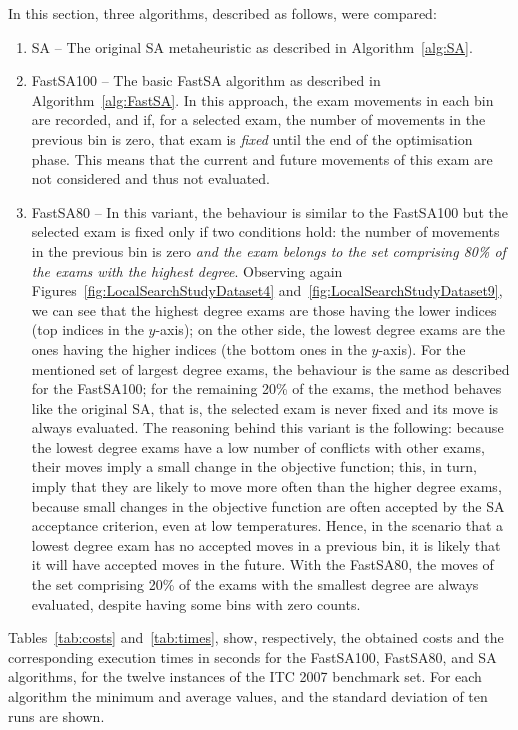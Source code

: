 In this section, three algorithms, described as follows, were compared: 
\begin{enumerate}
	\item SA -- The original SA metaheuristic as described in Algorithm~\ref{alg:SA}.
	
	\item FastSA100 -- The basic FastSA algorithm as described in Algorithm~\ref{alg:FastSA}. In this approach, the exam movements in each bin are recorded, and if, for a selected exam, the number of movements in the previous bin is zero, that exam is \textit{fixed} until the end of the optimisation phase. This means that the current and future movements of this exam are not considered and thus not evaluated.
	
	\item FastSA80 -- In this variant, the behaviour is similar to the FastSA100 but the selected exam is fixed only if two conditions hold: the number of movements in the previous bin is zero \textit{and the exam belongs to the set comprising 80\% of the exams with the highest degree}. Observing again Figures~\ref{fig:LocalSearchStudyDataset4} and~\ref{fig:LocalSearchStudyDataset9}, we can see that the highest degree exams are those having the lower indices (top indices in the $y$-axis); on the other side, the lowest degree exams are the ones having the higher indices (the bottom ones in the $y$-axis). For the mentioned set of largest degree exams, the behaviour is the same as described for the FastSA100; for the remaining 20\% of the exams, the method behaves like the original SA, that is, the selected exam is never fixed and its move is always evaluated. The reasoning behind this variant is the following: because the lowest degree exams have a low number of conflicts with other exams, their moves imply a small change in the objective function; this, in turn, imply that they are likely to move more often than the higher degree exams, because small changes in the objective function are often accepted by the SA acceptance criterion, even at low temperatures. Hence, in the scenario that a lowest degree exam has no accepted moves in a previous bin, it is likely that it will have accepted moves in the future. With the FastSA80, the moves of the set comprising 20\% of the exams with the smallest degree are always evaluated, despite having some bins with zero counts.
\end{enumerate}


Tables~\ref{tab:costs} and~\ref{tab:times}, show, respectively, the obtained costs and the corresponding execution times in seconds for the FastSA100, FastSA80, and SA algorithms, for the twelve instances of the ITC 2007 benchmark set. For each algorithm the minimum and average values, and the standard deviation of ten runs are shown. 



